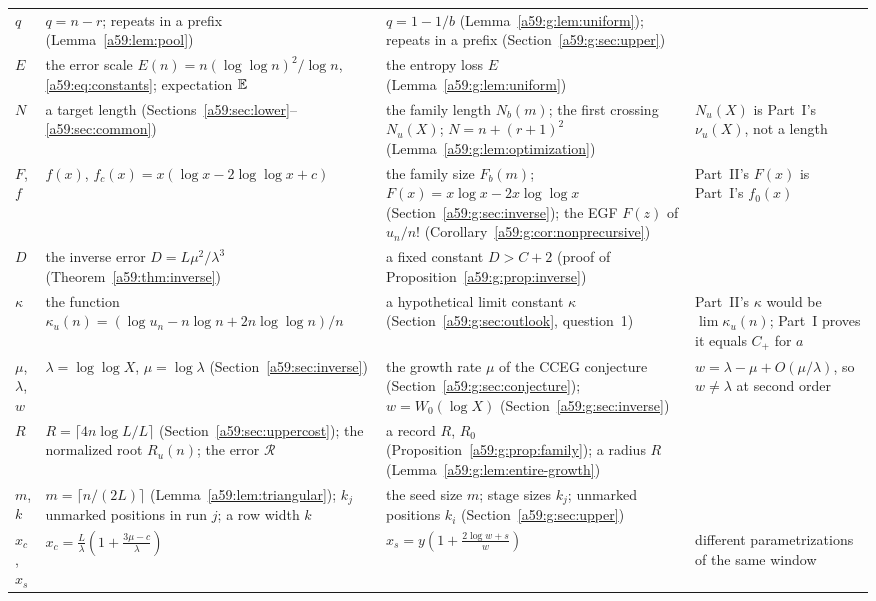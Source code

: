 \documentclass[11pt,letterpaper]{article}
\theoremstyle{remark}\newtheorem{remark}[theorem]{Remark}
\theoremstyle{remark}\newtheorem{wremark}{Remark}\renewcommand{\thewremark}{W\arabic{wremark}}
\theoremstyle{plain}\newtheorem{wcorollary}[wremark]{Corollary}
\begin{document}
\begin{small}
\begin{longtable}{@{}>{\raggedright\arraybackslash}p{}>{\raggedright\arraybackslash}p{}>{\raggedright\arraybackslash}p{}>{\raggedright\arraybackslash}p{}@{}}
$q$ & $q=n-r$; repeats in a prefix (Lemma~\ref{a59:lem:pool}) & $q=1-1/b$ (Lemma~\ref{a59:g:lem:uniform}); repeats in a prefix (Section~\ref{a59:g:sec:upper}) & \\
$E$ & the error scale $E(n)=n(\log\log n)^2/\log n$, \eqref{a59:eq:constants}; expectation $\mathbb E$ & the entropy loss $E$ (Lemma~\ref{a59:g:lem:uniform}) & \\
$N$ & a target length (Sections~\ref{a59:sec:lower}--\ref{a59:sec:common}) & the family length $N_b(m)$; the first crossing $N_u(X)$; $N=n+(r+1)^2$ (Lemma~\ref{a59:g:lem:optimization}) & $N_u(X)$ is Part~I's $\nu_u(X)$, not a length\\
$F$, $f$ & $f(x)$, $f_c(x)=x(\log x-2\log\log x+c)$ & the family size $F_b(m)$; $F(x)=x\log x-2x\log\log x$ (Section~\ref{a59:g:sec:inverse}); the EGF $F(z)$ of $u_n/n!$ (Corollary~\ref{a59:g:cor:nonprecursive}) & Part~II's $F(x)$ is Part~I's $f_0(x)$\\
$D$ & the inverse error $D=L\mu^2/\lambda^3$ (Theorem~\ref{a59:thm:inverse}) & a fixed constant $D>C+2$ (proof of Proposition~\ref{a59:g:prop:inverse}) & \\
$\kappa$ & the function $\kappa_u(n)=(\log u_n-n\log n+2n\log\log n)/n$ & a hypothetical limit constant $\kappa$ (Section~\ref{a59:g:sec:outlook}, question~1) & Part~II's $\kappa$ would be $\lim\kappa_u(n)$; Part~I proves it equals $C_+$ for $a$\\
$\mu$, $\lambda$, $w$ & $\lambda=\log\log X$, $\mu=\log\lambda$ (Section~\ref{a59:sec:inverse}) & the growth rate $\mu$ of the CCEG conjecture (Section~\ref{a59:g:sec:conjecture}); $w=W_0(\log X)$ (Section~\ref{a59:g:sec:inverse}) & $w=\lambda-\mu+O(\mu/\lambda)$, so $w\ne\lambda$ at second order\\
$R$ & $R=\lceil4n\log L/L\rceil$ (Section~\ref{a59:sec:uppercost}); the normalized root $R_u(n)$; the error $\mathcal R$ & a record $R$, $R_0$ (Proposition~\ref{a59:g:prop:family}); a radius $R$ (Lemma~\ref{a59:g:lem:entire-growth}) & \\
$m$, $k$ & $m=\lceil n/(2L)\rceil$ (Lemma~\ref{a59:lem:triangular}); $k_j$ unmarked positions in run $j$; a row width $k$ & the seed size $m$; stage sizes $k_j$; unmarked positions $k_i$ (Section~\ref{a59:g:sec:upper}) & \\
$x_c$, $x_s$ & $x_c=\frac L\lambda(1+\frac{3\mu-c}\lambda)$ & $x_s=y(1+\frac{2\log w+s}w)$ & different parametrizations of the same window\\
\bottomrule
\end{longtable}
\end{small}
\end{document}

